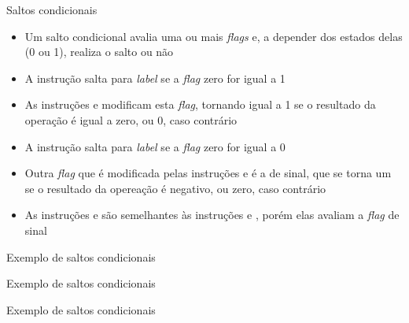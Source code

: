\begin{frame}[fragile]{Saltos condicionais}

    \begin{itemize}
        \item Um salto condicional avalia uma ou mais \textit{flags} e, a depender dos estados
            delas (0 ou 1), realiza o salto ou não

        \item A instrução  salta para \textit{label} se a \textit{flag} zero for 
            igual a 1

        \item As instruções  e   modificam esta \textit{flag}, 
            tornando igual a 1 se o resultado da operação é igual a zero, ou 0, caso contrário

        \item A instrução  salta para \textit{label} se a \textit{flag} zero for 
            igual a 0

        \item Outra \textit{flag} que é modificada pelas instruções  e 
             é a de sinal, que se torna um se o resultado da opereação é negativo,
            ou zero, caso contrário

        \item As instruções  e  são semelhantes às instruções
             e , porém elas avaliam a \textit{flag} de sinal
    \end{itemize}

\end{frame}

\begin{frame}[fragile]{Exemplo de saltos condicionais}
\end{frame}

\begin{frame}[fragile]{Exemplo de saltos condicionais}
\end{frame}

\begin{frame}[fragile]{Exemplo de saltos condicionais}
\end{frame}

